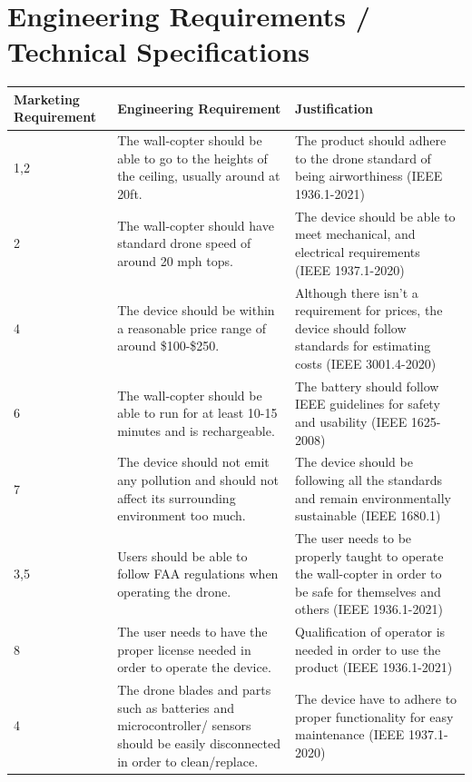 \documentclass[12pt]{article}
\begin{document}
    \newpage
    \section{Engineering Requirements / Technical Specifications}
        \begin{longtable}{ | m{4.25cm} | m{5cm}| m{5.4cm} | }
            \hline
            Marketing Requirement & Engineering Requirement & Justification \\\hline
            1,2 &
            The wall-copter should be able to go to the heights of the ceiling, usually around at 20ft. &
            The product should adhere to the drone standard of being airworthiness (IEEE 1936.1-2021) \\\hline
            2 &
            The wall-copter should have standard drone speed of around 20 mph tops. &
            The device should be able to meet mechanical, and electrical requirements (IEEE 1937.1-2020) \\\hline
            4 &
            The device should be within a reasonable price range of around \$100-\$250. &
            Although there isn't a requirement for prices, the device should follow standards for estimating costs (IEEE 3001.4-2020)\\\hline
            6 &
            The wall-copter should be able to run for at least 10-15 minutes and is rechargeable. &
            The battery should follow IEEE guidelines for safety and usability (IEEE 1625-2008)\\\hline
            7 &
            The device should not emit any pollution and should not affect its surrounding environment too much. &
            The device should be following all the standards and remain environmentally sustainable (IEEE 1680.1) \\\hline
            3,5 &
            Users should be able to follow FAA regulations when operating the drone. &
            The user needs to be properly taught to operate the wall-copter in order to be safe for themselves and others (IEEE 1936.1-2021) \\\hline
            8 &
            The user needs to have the proper license needed in order to operate the device. &
            Qualification of operator is needed in order to use the product (IEEE 1936.1-2021) \\\hline
            4 &
            The drone blades and parts such as batteries and microcontroller/ sensors should be easily disconnected in order to clean/replace. &
            The device have to adhere to proper functionality for easy maintenance (IEEE 1937.1-2020) \\\hline

\end{longtable}
\end{document}
